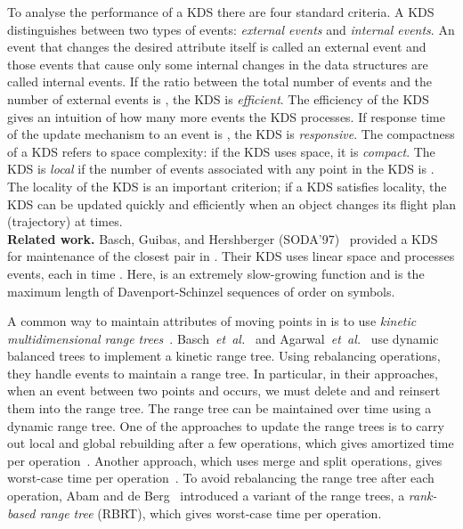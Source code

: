 \documentclass[11pt]{llncs}
\newcommand{\etal}{\emph{et~al.}}
\begin{document}
To analyse the performance of a KDS there are four standard criteria. A KDS distinguishes between two types of events: \textit{external events} and \textit{internal events}. An event that changes the desired attribute itself is called an external event and those events that cause only some internal changes in the data structures are called internal events. If the ratio between the total number of events and the number of external events is , the KDS is \textit{efficient}. The efficiency of the KDS gives an intuition of how many more events the KDS processes. If response time of the update mechanism to an event is , the KDS is \textit{responsive}. The compactness of a KDS refers to space complexity: if the KDS uses  space, it is \textit{compact}. The KDS is \textit{local} if the number of events associated with any point in the KDS is . The locality of the KDS is an important criterion; if a KDS satisfies locality, the KDS can be updated quickly and efficiently when an object changes its flight plan (trajectory) at times. 
\vspace{+5pt}
\\
\textbf{Related work.}
Basch, Guibas, and Hershberger (SODA'97)~\cite{Basch:1997:DSM:314161.314435} provided a KDS for maintenance of the closest pair in . Their KDS uses linear space and processes  events, each in time . Here,  is an extremely slow-growing function and  is the maximum length of Davenport-Schinzel sequences of order  on  symbols.

A common way to maintain attributes of moving points in  is to use \textit{kinetic multidimensional range trees}~\cite{Basch:1997:PPM:262839.262998,Agarwal:2008:KDD:1435375.1435379,Abam:2007:KKL:1247069.1247133}.  Basch~\etal~\cite{Basch:1997:PPM:262839.262998} and Agarwal~\etal~\cite{Agarwal:2008:KDD:1435375.1435379} use dynamic balanced trees to implement a kinetic range tree. Using rebalancing operations, they handle events to maintain a range tree. In particular, in their approaches, when an event between two points  and  occurs, we must delete  and  and reinsert them into the range tree. The range tree can be maintained over time using a dynamic range tree. One of the approaches to update the range trees is to carry out local and global rebuilding after a few operations, which gives  amortized time per operation~\cite{Mehlhorn:1984:DSA:1923}. Another approach, which uses merge and split operations, gives worst-case time  per operation~\cite{Willard:1985:ARR:3828.3839}. To avoid rebalancing the range tree after each operation, Abam and de Berg~\cite{Abam:2011:KSX:1971362.1971367} introduced a variant of the range trees, a \textit{rank-based range tree} (RBRT), which gives worst-case time  per operation.
\end{document}
